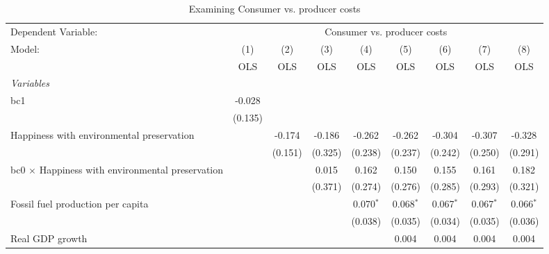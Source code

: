 
\begin{table}[htbp]
   \caption{Examining Consumer vs. producer costs}
   \centering
   \begin{tabular}{lcccccccc}
      \toprule
      Dependent Variable: & \multicolumn{8}{c}{Consumer vs. producer costs}\\
      Model:                                                  & (1)     & (2)     & (3)     & (4)         & (5)         & (6)         & (7)         & (8)\\  
                                                              &  OLS    & OLS     & OLS     & OLS         & OLS         & OLS         & OLS         & OLS\\  
      \midrule
      \emph{Variables}\\
      bc1                                                     & -0.028  &         &         &             &             &             &             &   \\   
                                                              & (0.135) &         &         &             &             &             &             &   \\   
      Happiness with environmental preservation               &         & -0.174  & -0.186  & -0.262      & -0.262      & -0.304      & -0.307      & -0.328\\   
                                                              &         & (0.151) & (0.325) & (0.238)     & (0.237)     & (0.242)     & (0.250)     & (0.291)\\   
      bc0 $\times$ Happiness with environmental preservation  &         &         & 0.015   & 0.162       & 0.150       & 0.155       & 0.161       & 0.182\\   
                                                              &         &         & (0.371) & (0.274)     & (0.276)     & (0.285)     & (0.293)     & (0.321)\\   
      Fossil fuel production per capita                       &         &         &         & 0.070$^{*}$ & 0.068$^{*}$ & 0.067$^{*}$ & 0.067$^{*}$ & 0.066$^{*}$\\   
                                                              &         &         &         & (0.038)     & (0.035)     & (0.034)     & (0.035)     & (0.036)\\   
      Real GDP growth                                         &         &         &         &             & 0.004       & 0.004       & 0.004       & 0.004\\   

\end{tabular}
\end{table}
